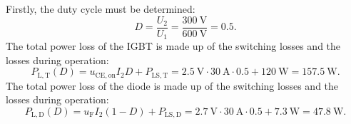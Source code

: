 \begin{solutionblock}
Firstly, the duty cycle must be determined:
\begin{equation}
    D = \frac{U_\mathrm{2}}{U_\mathrm{1}} = \frac{\SI{300}{\volt}}{\SI{600}{\volt}} = 0.5.
\end{equation}
The total power loss of the IGBT is made up of the switching losses and the losses during operation:
\begin{equation}
    P_{\mathrm{L,T}}(D) = u_{\mathrm{CE,on}} I_\mathrm{2} D +  P_{\mathrm{LS,T}} = \SI{2.5}{\volt} \cdot \SI{30}{\ampere} \cdot 0.5 + \SI{120}{\watt} = \SI{157.5}{\watt}.
\end{equation}
The total power loss of the diode is made up of the switching losses and the losses during operation:
\begin{equation}
    P_{\mathrm{L,D}}(D) = u_{\mathrm{F}} I_\mathrm{2} (1-D) +  P_{\mathrm{LS,D}} = \SI{2.7}{\volt} \cdot \SI{30}{\ampere} \cdot 0.5 + \SI{7.3}{\watt} = \SI{47.8}{\watt}.
\end{equation}
\end{solutionblock}
    